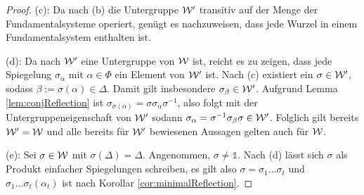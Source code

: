 \begin{proof}
  (c):
  Da nach (b) die Untergruppe $\mathcal{W}'$ transitiv auf der Menge der Fundamentalsysteme operiert, genügt es nachzuweisen, dass jede Wurzel in einem Fundamentalsystem enthalten ist.

  (d):
  Da nach $\mathcal{W}'$ eine Untergruppe von $\mathcal{W}$ ist, reicht es zu zeigen, dass jede Spiegelung $\sigma_\alpha$ mit $\alpha \in \Phi$ ein Element von $\mathcal{W}'$ ist.
  Nach (c) existiert ein $\sigma \in \mathcal{W}'$, sodass $\beta := \sigma(\alpha) \in \Delta$.
  Damit gilt insbesondere $\sigma_\beta \in \mathcal{W}'$.
  Aufgrund Lemma \ref{lem:conjReflection} ist $\sigma_{\sigma(\alpha)} = \sigma \sigma_\alpha \sigma^{-1}$, also folgt mit der Untergruppeneigenschaft von $\mathcal{W}'$ sodann $\sigma_\alpha = \sigma^{-1} \sigma_\beta \sigma \in \mathcal{W}'$.
  Folglich gilt bereits $\mathcal{W}' = \mathcal{W}$ und alle bereits für $\mathcal{W}'$ bewiesenen Aussagen gelten auch für $\mathcal{W}$.

  (e):
  Sei $\sigma \in \mathcal{W}$ mit $\sigma(\Delta) = \Delta$.
  Angenommen, $\sigma \neq \mathds{1}$.
  Nach (d) lässt sich $\sigma$ als Produkt einfacher Spiegelungen schreiben, es gilt also $\sigma = \sigma_1\dots\sigma_t$ und $\sigma_1 \dots \sigma_t(\alpha_t)$ ist nach Korollar \ref{cor:minimalReflection}.
\end{proof}
